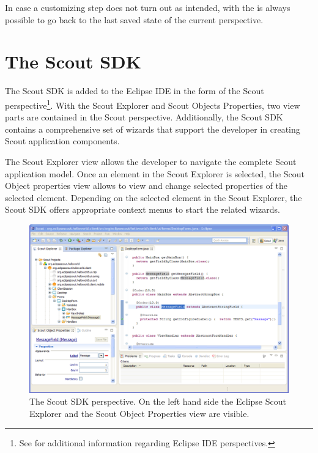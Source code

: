 \documentclass[a4paper,10pt,twoside]{book}
\begin{document}
In case a customizing step does not turn out as intended, with the  is always possible to go back to the last saved state of the current perspective.

\section{The Scout SDK}

The Scout SDK is added to the Eclipse IDE in the form of the Scout perspective\footnote{
See  for additional information regarding Eclipse IDE perspectives. 
}.
With the Scout Explorer and Scout Objects Properties, two view parts are contained in the Scout perspective. 
Additionally, the Scout SDK contains a comprehensive set of wizards that support the developer in creating Scout application components. 

The Scout Explorer view allows the developer to navigate the complete Scout application model. 
Once an element in the Scout Explorer is selected, the Scout Object properties view allows to view and change selected properties of the selected element. 
Depending on the selected element in the Scout Explorer, the Scout SDK offers appropriate context menus to start the related wizards.

\begin{figure}
\includegraphics[width=14cm]{scout_sdk_perspective.png} 
\caption{The Scout SDK perspective. On the left hand side the Eclipse Scout Explorer and the Scout Object Properties view are visible.}
\end{figure}
\end{document}
